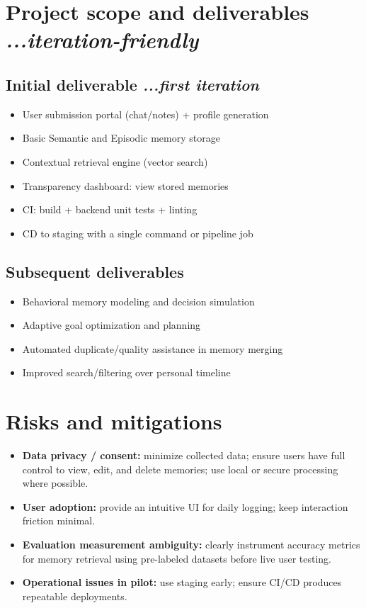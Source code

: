\documentclass[11pt,a4paper]{article}
\begin{document}
\section[Project scope and deliverables]{Project scope and deliverables \hfill \normalsize\normalfont\textit{...iteration-friendly}}

\subsection[Initial deliverable]{Initial deliverable \hfill \normalsize\normalfont\textit{...first iteration}}
\begin{itemize}
    \item User submission portal (chat/notes) + profile generation
    \item Basic Semantic and Episodic memory storage
    \item Contextual retrieval engine (vector search)
    \item Transparency dashboard: view stored memories
    \item CI: build + backend unit tests + linting
    \item CD to staging with a single command or pipeline job
\end{itemize}

\subsection{Subsequent deliverables}
\begin{itemize}
    \item Behavioral memory modeling and decision simulation
    \item Adaptive goal optimization and planning
    \item Automated duplicate/quality assistance in memory merging
    \item Improved search/filtering over personal timeline
\end{itemize}

\section{Risks and mitigations}
\begin{itemize}
    \item \textbf{Data privacy / consent:} minimize collected data; ensure users have full control to view, edit, and delete memories; use local or secure processing where possible.
    \item \textbf{User adoption:} provide an intuitive UI for daily logging; keep interaction friction minimal.
    \item \textbf{Evaluation measurement ambiguity:} clearly instrument accuracy metrics for memory retrieval using pre-labeled datasets before live user testing.
    \item \textbf{Operational issues in pilot:} use staging early; ensure CI/CD produces repeatable deployments.
\end{itemize}
\end{document}
